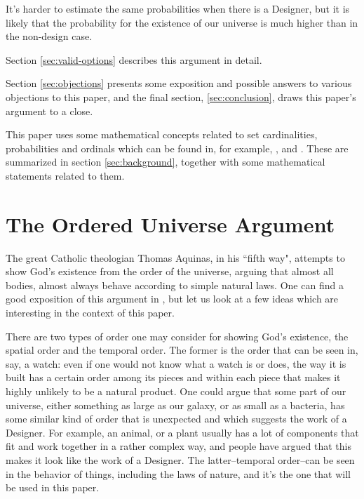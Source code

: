 \documentclass[a4paper
,draft
]{article}
\newcommand{\paper}[1]{paper}
\newcommand{\ghilimele}[1]{``#1"}
\begin{document}
It's harder to estimate the same probabilities when there is a Designer, but
it is likely that the probability for the existence of our universe is much higher than in the
non-design case.

Section \ref{sec:valid-options} describes this argument in detail.

Section \ref{sec:objections} presents some exposition and possible
answers to various objections to this paper,
and the final section, \ref{sec:conclusion}, draws this \paper{}'s argument to a close.

This \paper{} uses some mathematical concepts related to set cardinalities,
probabilities and ordinals which can be found in, for example,
\textcite{sep-set-theory}, \textcite{Cohen1966} and \textcite{Billingsley1995}.
These are summarized in section \ref{sec:background}, together with some
mathematical statements related to them.

\section{The Ordered Universe Argument}
\label{sec:ordered-universe}

The great Catholic theologian Thomas Aquinas,
in his \ghilimele{fifth way}, attempts to show God's existence from
the order of the universe, arguing that almost all bodies, almost always
behave according to simple natural laws.
One can find a good exposition of this argument in
\parencite{swinburne1968}, but let us look at a few ideas which are
interesting in the context of this \paper{}.

There are two types of order one may consider for showing God's existence,
the spatial order and the temporal order.
The former is the order that can be seen in, say, a watch:
even if one would not know what a watch is or does,
the way it is built has a certain order among its pieces
and within each piece that makes it highly unlikely to be a natural product.
One could argue that some part of our universe,
either something as large as our galaxy, or as small as a bacteria,
has some similar kind of order that is unexpected and which suggests
the work of a Designer.
For example, an animal, or a plant usually has a lot of components that
fit and work together in a rather complex way,
and people have argued that this makes it look like the work of a Designer.
The latter–temporal order–can be seen in the behavior of things, including the laws of
nature, and it's the one that will be used in this \paper{}.
\end{document}
